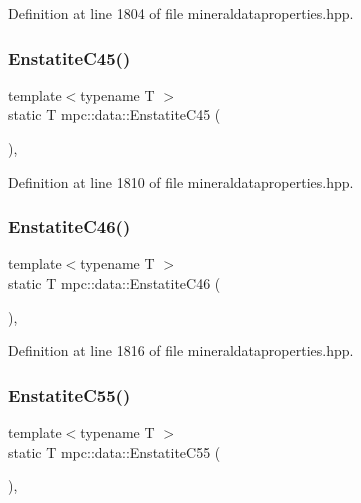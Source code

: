 Definition at line 1804 of file mineraldataproperties.\+hpp.

\mbox{\label{namespacempc_1_1data_a9278bf5c91ccef7355d026b4bcf32ef7}} 
\subsubsection{\texorpdfstring{Enstatite\+C45()}{EnstatiteC45()}}
{\footnotesize\ttfamily template$<$typename T $>$ \\
static T mpc\+::data\+::\+Enstatite\+C45 (\begin{DoxyParamCaption}{ }\end{DoxyParamCaption})\hspace{0.3cm}{\ttfamily [inline]}, {\ttfamily [static]}}



Definition at line 1810 of file mineraldataproperties.\+hpp.

\mbox{\label{namespacempc_1_1data_a623660a7d924db21002f5b42c8260f4c}} 
\subsubsection{\texorpdfstring{Enstatite\+C46()}{EnstatiteC46()}}
{\footnotesize\ttfamily template$<$typename T $>$ \\
static T mpc\+::data\+::\+Enstatite\+C46 (\begin{DoxyParamCaption}{ }\end{DoxyParamCaption})\hspace{0.3cm}{\ttfamily [inline]}, {\ttfamily [static]}}



Definition at line 1816 of file mineraldataproperties.\+hpp.

\mbox{\label{namespacempc_1_1data_ab487cfab49eb0356b1b55c3befee0f03}} 
\subsubsection{\texorpdfstring{Enstatite\+C55()}{EnstatiteC55()}}
{\footnotesize\ttfamily template$<$typename T $>$ \\
static T mpc\+::data\+::\+Enstatite\+C55 (\begin{DoxyParamCaption}{ }\end{DoxyParamCaption})\hspace{0.3cm}{\ttfamily [inline]}, {\ttfamily [static]}}



